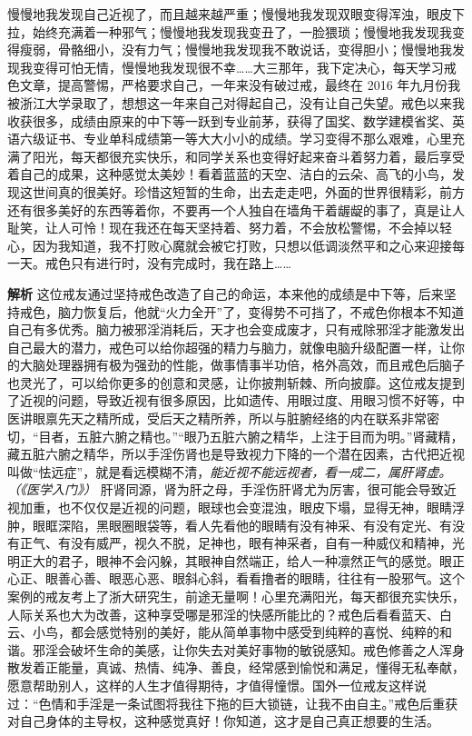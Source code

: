 \begin{case}
    慢慢地我发现自己近视了，而且越来越严重；慢慢地我发现双眼变得浑浊，眼皮下拉，始终充满着一种邪气；慢慢地我发现我变丑了，一脸猥琐；慢慢地我发现我变得瘦弱，骨骼细小，没有力气；慢慢地我发现我不敢说话，变得胆小；慢慢地我发现我变得可怕无情，慢慢地我发现很不幸……大三那年，我下定决心，每天学习戒色文章，提高警惕，严格要求自己，一年来没有破过戒，最终在 2016 年九月份我被浙江大学录取了，想想这一年来自己对得起自己，没有让自己失望。戒色以来我收获很多，成绩由原来的中下等一跃到专业前茅，获得了国奖、数学建模省奖、英语六级证书、专业单科成绩第一等大大小小的成绩。学习变得不那么艰难，心里充满了阳光，每天都很充实快乐，和同学关系也变得好起来奋斗着努力着，最后享受着自己的成果，这种感觉太美妙！看着蓝蓝的天空、洁白的云朵、高飞的小鸟，发现这世间真的很美好。珍惜这短暂的生命，出去走走吧，外面的世界很精彩，前方还有很多美好的东西等着你，不要再一个人独自在墙角干着龌龊的事了，真是让人耻笑，让人可怜！现在我还在每天坚持着、努力着，不会放松警惕，不会掉以轻心，因为我知道，我不打败心魔就会被它打败，只想以低调淡然平和之心来迎接每一天。戒色只有进行时，没有完成时，我在路上……

    \textbf{解析} 这位戒友通过坚持戒色改造了自己的命运，本来他的成绩是中下等，后来坚持戒色，脑力恢复后，他就“火力全开”了，变得势不可挡了，不戒色你根本不知道自己有多优秀。脑力被邪淫消耗后，天才也会变成废才，只有戒除邪淫才能激发出自己最大的潜力，戒色可以给你超强的精力与脑力，就像电脑升级配置一样，让你的大脑处理器拥有极为强劲的性能，做事情事半功倍，格外高效，而且戒色后脑子也灵光了，可以给你更多的创意和灵感，让你披荆斩棘、所向披靡。这位戒友提到了近视的问题，导致近视有很多原因，比如遗传、用眼过度、用眼习惯不好等，中医讲眼禀先天之精所成，受后天之精所养，所以与脏腑经络的内在联系非常密切，“目者，五脏六腑之精也。”“眼乃五脏六腑之精华，上注于目而为明。”肾藏精，藏五脏六腑之精华，所以手淫伤肾也是导致视力下降的一个潜在因素，古代把近视叫做“怯远症”，就是看远模糊不清，\textit{能近视不能远视者，看一成二，属肝肾虚。（《医学入门》）} 肝肾同源，肾为肝之母，手淫伤肝肾尤为厉害，很可能会导致近视加重，也不仅仅是近视的问题，眼球也会变混浊，眼皮下塌，显得无神，眼睛浮肿，眼眶深陷，黑眼圈眼袋等，看人先看他的眼睛有没有神采、有没有定光、有没有正气、有没有威严，视久不脱，足神也，眼有神采者，自有一种威仪和精神，光明正大的君子，眼神不会闪躲，其眼神自然端正，给人一种凛然正气的感觉。眼正心正、眼善心善、眼恶心恶、眼斜心斜，看看撸者的眼睛，往往有一股邪气。这个案例的戒友考上了浙大研究生，前途无量啊！心里充满阳光，每天都很充实快乐，人际关系也大为改善，这种享受哪是邪淫的快感所能比的？戒色后看看蓝天、白云、小鸟，都会感觉特别的美好，能从简单事物中感受到纯粹的喜悦、纯粹的和谐。邪淫会破坏生命的美感，让你失去对美好事物的敏锐感知。戒色修善之人浑身散发着正能量，真诚、热情、纯净、善良，经常感到愉悦和满足，懂得无私奉献，愿意帮助别人，这样的人生才值得期待，才值得憧憬。国外一位戒友这样说过：“色情和手淫是一条试图将我往下拖的巨大锁链，让我不由自主。”戒色后重获对自己身体的主导权，这种感觉真好！你知道，这才是自己真正想要的生活。
\end{case}

